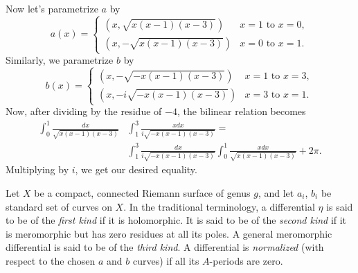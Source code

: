 \documentclass[expanded]{lkx_pset}
\begin{document}
Now let's parametrize $a$ by
\[
	a(x) = \begin{cases} (x, \sqrt{x(x-1)(x-3)}) & x=1\textrm{ to } x=0,\\ (x,-\sqrt{x(x-1)(x-3)})& x=0\textrm{ to }x=1.\end{cases}
\]
Similarly, we parametrize $b$ by
\[
	b(x) = \begin{cases} (x, -\sqrt{-x(x-1)(x-3)}) & x=1\textrm{ to } x=3,\\ (x,-i\sqrt{-x(x-1)(x-3)})& x=3\textrm{ to }x=1.\end{cases}
\]
Now, after dividing by the residue of $-4$, the bilinear relation becomes
\begin{align*}
	\int_0^1 \frac{dx}{\sqrt{x(x-1)(x-3)}}
	 & \int_1^3 \frac{x dx}{i\sqrt{-x(x-1)(x-3)}} = \\
	 & \int_1^3 \frac{dx}{i\sqrt{-x(x-1)(x-3)}}
	\int_0^1 \frac{x dx}{\sqrt{x(x-1)(x-3)}} + 2\pi.
\end{align*}
Multiplying by $i$, we get our desired equality.

\begin{problem}{3}
Let $X$ be a compact, connected Riemann surface of genus $g$, and let $a_i$, $b_i$
be standard set of curves on $X$. In the traditional terminology,
a differential
$\eta$ is said to be of the \emph{first kind} if it is holomorphic.
It is said to be of the \emph{second kind} if it is meromorphic but
has zero residues at all its poles.  A general meromorphic
differential is said to be of the \emph{third kind}.  A differential
is \emph{normalized} (with respect to the chosen $a$ and $b$ curves)
if all its $A$-periods are zero.
\end{problem}
\end{document}
